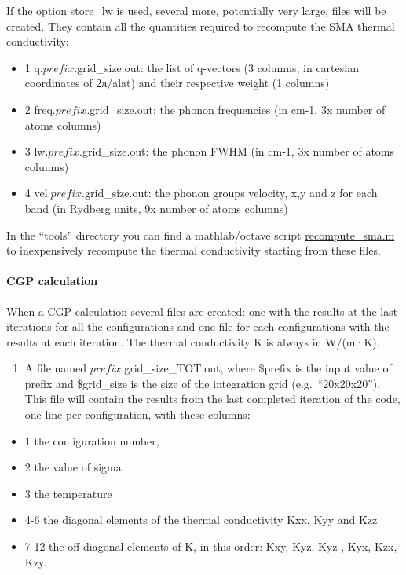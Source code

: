 \documentclass[
]{article}
\providecommand{\tightlist}{%
  \setlength{\itemsep}{0pt}\setlength{\parskip}{0pt}}
\begin{document}
If the option store\_lw is used, several more, potentially very large,
files will be created. They contain all the quantities required to
recompute the SMA thermal conductivity:

\begin{itemize}
\tightlist
\item
  1 q.\(prefix.\)grid\_size.out: the list of q-vectors (3 columns, in
  cartesian coordinates of 2π/alat) and their respective weight (1
  columns)
\item
  2 freq.\(prefix.\)grid\_size.out: the phonon frequencies (in cm-1, 3x
  number of atoms columns)
\item
  3 lw.\(prefix.\)grid\_size.out: the phonon FWHM (in cm-1, 3x number of
  atoms columns)
\item
  4 vel.\(prefix.\)grid\_size.out: the phonon groups velocity, x,y and z
  for each band (in Rydberg units, 9x number of atoms columns)
\end{itemize}

In the \enquote{tools} directory you can find a mathlab/octave script
\protect\hyperlink{recompute-smam}{recompute\_sma.m} to inexpensively
recompute the thermal conductivity starting from these files.

\hypertarget{cgp-calculation}{%
\paragraph{CGP calculation}\label{cgp-calculation}}

When a CGP calculation several files are created: one with the results
at the last iterations for all the configurations and one file for each
configurations with the results at each iteration. The thermal
conductivity K is always in W/(m·K).

\begin{enumerate}
\def\labelenumi{\arabic{enumi}.}
\tightlist
\item
  A file named \(prefix.\)grid\_size\_TOT.out, where \$prefix is the
  input value of prefix and \$grid\_size is the size of the integration
  grid (e.g.~\enquote{20x20x20}). This file will contain the results
  from the last completed iteration of the code, one line per
  configuration, with these columns:
\end{enumerate}

\begin{itemize}
\tightlist
\item
  1 the configuration number,
\item
  2 the value of sigma
\item
  3 the temperature
\item
  4-6 the diagonal elements of the thermal conductivity Kxx, Kyy and Kzz
\item
  7-12 the off-diagonal elements of K, in this order: Kxy, Kyz, Kyz ,
  Kyx, Kzx, Kzy.
\end{itemize}
\end{document}
